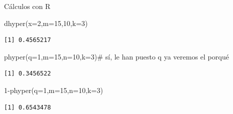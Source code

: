 \documentclass[
  ignorenonframetext,
  aspectratio=169]{beamer}
\newenvironment{Shaded}{\begin{snugshade}}{\end{snugshade}}
\newcommand{\AttributeTok}[1]{\textcolor[rgb]{0.40,0.45,0.13}{#1}}
\newcommand{\CommentTok}[1]{\textcolor[rgb]{0.37,0.37,0.37}{#1}}
\newcommand{\DecValTok}[1]{\textcolor[rgb]{0.68,0.00,0.00}{#1}}
\newcommand{\FunctionTok}[1]{\textcolor[rgb]{0.28,0.35,0.67}{#1}}
\newcommand{\NormalTok}[1]{\textcolor[rgb]{0.00,0.23,0.31}{#1}}
\newcommand{\SpecialCharTok}[1]{\textcolor[rgb]{0.37,0.37,0.37}{#1}}
\begin{document}
\begin{frame}[fragile]{Cálculos con R}
\protect\hypertarget{cuxe1lculos-con-r-10}{}
\begin{Shaded}
\begin{Highlighting}[]
\FunctionTok{dhyper}\NormalTok{(}\AttributeTok{x=}\DecValTok{2}\NormalTok{,}\AttributeTok{m=}\DecValTok{15}\NormalTok{,}\DecValTok{10}\NormalTok{,}\AttributeTok{k=}\DecValTok{3}\NormalTok{)}
\end{Highlighting}
\end{Shaded}

\begin{verbatim}
[1] 0.4565217
\end{verbatim}

\begin{Shaded}
\begin{Highlighting}[]
\FunctionTok{phyper}\NormalTok{(}\AttributeTok{q=}\DecValTok{1}\NormalTok{,}\AttributeTok{m=}\DecValTok{15}\NormalTok{,}\AttributeTok{n=}\DecValTok{10}\NormalTok{,}\AttributeTok{k=}\DecValTok{3}\NormalTok{)}\CommentTok{\# sí, le han puesto q ya veremos el porqué}
\end{Highlighting}
\end{Shaded}

\begin{verbatim}
[1] 0.3456522
\end{verbatim}

\begin{Shaded}
\begin{Highlighting}[]
\DecValTok{1}\SpecialCharTok{{-}}\FunctionTok{phyper}\NormalTok{(}\AttributeTok{q=}\DecValTok{1}\NormalTok{,}\AttributeTok{m=}\DecValTok{15}\NormalTok{,}\AttributeTok{n=}\DecValTok{10}\NormalTok{,}\AttributeTok{k=}\DecValTok{3}\NormalTok{)}
\end{Highlighting}
\end{Shaded}

\begin{verbatim}
[1] 0.6543478
\end{verbatim}
\end{frame}
\end{document}
